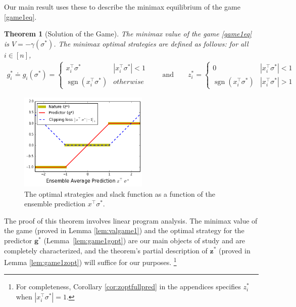 \documentclass{colt2015} %
\newtheorem{thm}{Theorem}%
\newcommand{\vg}{\mathbf{g}}
\newcommand{\vz}{\mathbf{z}}
\DeclareMathOperator{\sgn}{sgn}
\newcommand{\abs}[1]{\left| #1 \right|}
\begin{document}
Our main result uses these to describe the minimax equilibrium of the game \eqref{game1eq}.
\begin{thm}[Solution of the Game]
\label{thm:gamesolngen}
The minimax value of the game \eqref{game1eq} is 
$V = - \gamma (\sigma^*)$. 
The minimax optimal strategies are defined as follows:
for all $i \in [n]$,
\begin{align}
g_i^* \doteq g_i (\sigma^*) = \begin{cases} x_{i}^\top \sigma^* & \abs{x_{i}^\top \sigma^*} < 1 \\ 
\sgn(x_{i}^\top \sigma^*) & otherwise \end{cases}
\quad \quad \text{and} \quad \quad
z_i^* = 
\begin{cases} 
0 & \abs{x_{i}^\top \sigma^*} < 1 \\ 
\sgn(x_{i}^\top \sigma^*) & \abs{x_{i}^\top \sigma^*} > 1 
\end{cases}
\label{eqn:opt-strats}
\end{align}
\end{thm}

\begin{figure}
\centering
\includegraphics[width=0.55\textwidth]{figs/optstrats.png}
\caption{
\label{fig:optstrats}
The optimal strategies and slack function as a function of the ensemble prediction $x^\top \sigma^*$.}
\end{figure}

The proof of this theorem involves linear program analysis.
The minimax value of the game (proved in Lemma \ref{lem:valgame1}) and 
the optimal strategy for the predictor $\vg^*$ (Lemma~\ref{lem:game1gopt}) 
are our main objects of study and are completely characterized, 
and the theorem's partial description of $\vz^*$ (proved in Lemma \ref{lem:game1zopt}) 
will suffice for our purposes. 
\footnote{For completeness, Corollary \ref{cor:zoptfullpred} in the appendices 
specifies $z_i^*$ when $\abs{x_{i}^\top \sigma^*} = 1$.}
\end{document}
